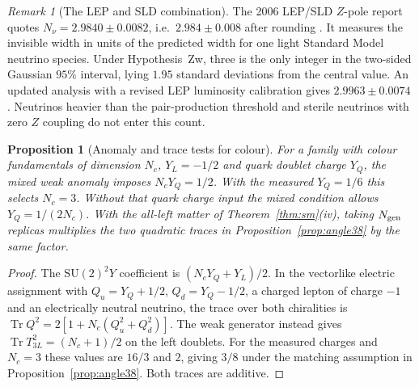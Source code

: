\documentclass[aps,pra,onecolumn,superscriptaddress,nofootinbib,10pt]{revtex4-2}
\newtheorem{proposition}[theorem]{Proposition}
\theoremstyle{definition}
\theoremstyle{remark}
\newtheorem{remark}[theorem]{Remark}
\newcommand{\SU}{\mathrm{SU}}
\begin{document}
\begin{remark}[The LEP and SLD combination]\label{gn:lep}
The 2006 LEP/SLD $Z$-pole report quotes $N_\nu=2.9840\pm0.0082$,
i.e.\ $2.984\pm0.008$ after rounding \cite[abstract]{gn:lepsource}.
It measures the invisible width in units of the predicted width
for one light Standard Model neutrino species. Under
Hypothesis~Zw, three is the only integer in the
two-sided Gaussian $95\%$ interval, lying $1.95$ standard deviations
from the central value. An updated analysis with a revised LEP
luminosity calibration gives $2.9963\pm0.0074$ \cite{gn:janot}.
Neutrinos heavier than the pair-production threshold and
sterile neutrinos with zero $Z$ coupling do not enter this count.
\end{remark}

\begin{proposition}[Anomaly and trace tests for colour]\label{gn:colour}
For a family with colour fundamentals of dimension $N_c$,
$Y_L=-1/2$ and quark doublet charge $Y_Q$, the mixed weak anomaly
imposes $N_cY_Q=1/2$. With the measured $Y_Q=1/6$ this selects
$N_c=3$. Without that quark charge input the mixed condition
allows $Y_Q=1/(2N_c)$. With the all-left matter of
Theorem~\ref{thm:sm}(iv), taking $N_{\rm gen}$ replicas
multiplies the two quadratic traces in
Proposition~\ref{prop:angle38} by the same factor.
\end{proposition}
\begin{proof}
The $\SU(2)^2Y$ coefficient is
$(N_cY_Q+Y_L)/2$. In the vectorlike electric assignment with
$Q_u=Y_Q+1/2$, $Q_d=Y_Q-1/2$, a charged lepton of charge $-1$
and an electrically neutral neutrino, the trace over both
chiralities is $\operatorname{Tr}Q^2=
2[1+N_c(Q_u^2+Q_d^2)]$. The weak generator instead gives
$\operatorname{Tr}T_{3L}^2=(N_c+1)/2$ on the left doublets.
For the measured charges and $N_c=3$ these values are $16/3$
and $2$, giving $3/8$ under the matching assumption in
Proposition~\ref{prop:angle38}. Both traces are additive.
\end{proof}
\end{document}
